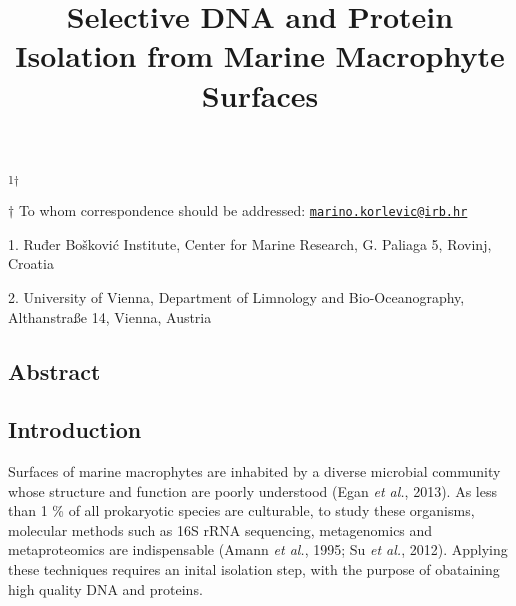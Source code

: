 \documentclass[12pt,]{article}
\title{\textbf{Selective DNA and Protein Isolation from Marine Macrophyte
Surfaces}}
\author{}
\date{}
\begin{document}
\maketitle

\vspace{80mm}

\textsuperscript{1\(\dagger\)}

\vspace{40mm}

\(\dagger\) To whom correspondence should be addressed:
\href{mailto:marino.korlevic@irb.hr}{\nolinkurl{marino.korlevic@irb.hr}}

1. Ruđer Bošković Institute, Center for Marine Research, G. Paliaga 5,
Rovinj, Croatia

2. University of Vienna, Department of Limnology and Bio-Oceanography,
Althanstraße 14, Vienna, Austria \newpage
\linenumbers
\setlength\parindent{24pt}

\subsection{Abstract}\label{abstract}

\newpage

\subsection{Introduction}\label{introduction}

Surfaces of marine macrophytes are inhabited by a diverse microbial
community whose structure and function are poorly understood (Egan
\emph{et al.}, 2013). As less than 1 \% of all prokaryotic species are
culturable, to study these organisms, molecular methods such as 16S rRNA
sequencing, metagenomics and metaproteomics are indispensable (Amann
\emph{et al.}, 1995; Su \emph{et al.}, 2012). Applying these techniques
requires an inital isolation step, with the purpose of obataining high
quality DNA and proteins.
\end{document}

